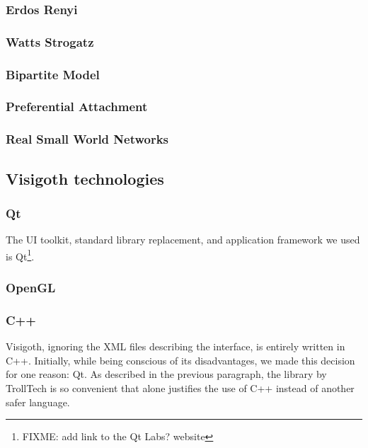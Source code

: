 \documentclass[a4paper,11pt,titlepage]{article}
\begin{document}
\subsubsection{Erdos Renyi}

\subsubsection{Watts Strogatz}

\subsubsection{Bipartite Model}

\subsubsection{Preferential Attachment}

\subsubsection{Real Small World Networks}

\subsection{Visigoth technologies}

\subsubsection{Qt}

The UI toolkit, standard library replacement, and application
framework we used is Qt\footnote{FIXME: add link to the Qt Labs?
  website}.

\subsubsection{OpenGL}

\subsubsection{C++}

Visigoth, ignoring the XML files describing the interface, is entirely written
in C++. Initially, while being conscious of its disadvantages, we made this
decision for one reason: Qt. As described in the previous paragraph, the library
by TrollTech is so convenient that alone justifies the use of C++ instead of
another safer language.
\end{document}
